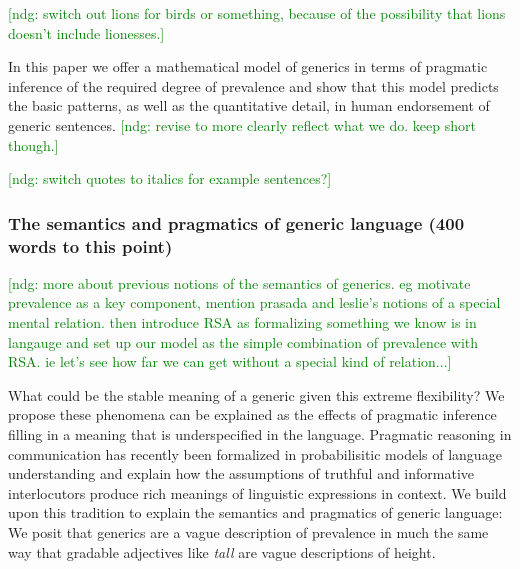 \documentclass[10pt,letterpaper]{article}
\newcommand{\ndg}[1]{\textcolor{Green}{[ndg: #1]}}
\begin{document}
\ndg{switch out lions for birds or something, because of the possibility that lions doesn't include lionesses.}

In this paper we offer a mathematical model of generics in terms of pragmatic inference of the required degree of prevalence and show that this model predicts the basic patterns, as well as the quantitative detail, in human endorsement of generic sentences. \ndg{revise to more clearly reflect what we do. keep short though.}

\ndg{switch quotes to italics for example sentences?}


\subsubsection{The semantics and pragmatics of generic language  (400 words to this point)}

\ndg{more about previous notions of the semantics of generics. eg motivate prevalence as a key component, mention prasada and leslie's notions of a special mental relation. then introduce RSA as formalizing something we know is in langauge and set up our model as the simple combination of prevalence with RSA. ie let's see how far we can get without a special kind of relation...}

What could be the stable meaning of a generic given this extreme flexibility? 
We propose these phenomena can be explained as the effects of pragmatic inference filling in a meaning that is underspecified in the language. 
Pragmatic reasoning in communication has recently been formalized in probabilisitic models of language understanding \cite{Frank2012, Goodman2013, Franke2009} and explain how the assumptions of truthful and informative interlocutors \cite{Clark1996, Grice1975, Levinson2000} produce rich meanings of linguistic expressions in context. 
We build upon this tradition to explain the semantics and pragmatics of generic language: We posit that generics are a vague description of prevalence in much the same way that gradable adjectives like \emph{tall} are vague descriptions of height. 
\end{document}
